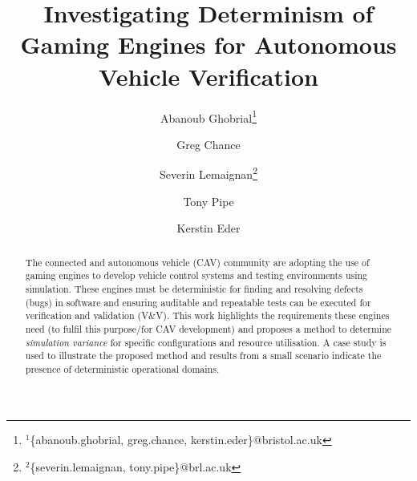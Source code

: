 \documentclass[letterpaper, 10 pt, journal, twoside]{IEEEtran}
\begin{document}
% 
% 
% 
% 
% 
% 
% 

\title{Investigating Determinism of Gaming Engines for Autonomous Vehicle Verification}
\author[1,3]{Abanoub Ghobrial\thanks{$^{1}${\footnotesize \{abanoub.ghobrial, greg.chance, kerstin.eder\}@bristol.ac.uk}}}
\author[1,3]{Greg Chance}
\author[2,3]{Severin Lemaignan\thanks{$^{2}${\footnotesize \{severin.lemaignan, tony.pipe\}@brl.ac.uk}}}
\author[2,3]{Tony Pipe}
\author[1,3]{Kerstin Eder}
\maketitle

\begin{abstract}
\noindent 
The connected and autonomous vehicle (CAV) community are adopting the use of gaming engines to develop vehicle control systems and testing environments using simulation. These engines must be deterministic for finding and resolving defects (bugs) in software and ensuring auditable and repeatable tests can be executed for verification and validation (V\&V). This work highlights the requirements these engines need (to fulfil this purpose/for CAV development) and proposes a method to determine \textit{simulation variance} for specific configurations and resource utilisation. A case study is used to illustrate the proposed method and results from a small scenario indicate the presence of deterministic operational domains. 
\end{abstract}
\end{document}
